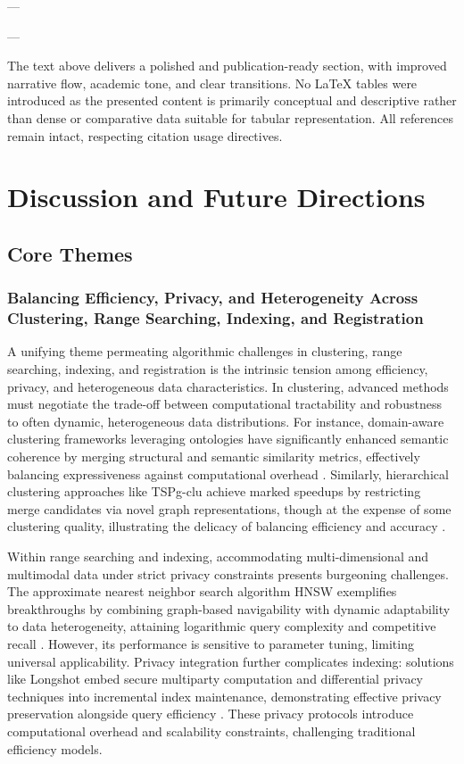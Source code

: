 \documentclass[11pt]{article}
\begin{document}
---

  


---

The text above delivers a polished and publication-ready section, with improved narrative flow, academic tone, and clear transitions. No LaTeX tables were introduced as the presented content is primarily conceptual and descriptive rather than dense or comparative data suitable for tabular representation. All references remain intact, respecting citation usage directives.

\section{Discussion and Future Directions}

\subsection{Core Themes}

\subsubsection{Balancing Efficiency, Privacy, and Heterogeneity Across Clustering, Range Searching, Indexing, and Registration}

A unifying theme permeating algorithmic challenges in clustering, range searching, indexing, and registration is the intrinsic tension among efficiency, privacy, and heterogeneous data characteristics. In clustering, advanced methods must negotiate the trade-off between computational tractability and robustness to often dynamic, heterogeneous data distributions. For instance, domain-aware clustering frameworks leveraging ontologies have significantly enhanced semantic coherence by merging structural and semantic similarity metrics, effectively balancing expressiveness against computational overhead \cite{ref23}. Similarly, hierarchical clustering approaches like TSPg-clu achieve marked speedups by restricting merge candidates via novel graph representations, though at the expense of some clustering quality, illustrating the delicacy of balancing efficiency and accuracy \cite{ref28}.

Within range searching and indexing, accommodating multi-dimensional and multimodal data under strict privacy constraints presents burgeoning challenges. The approximate nearest neighbor search algorithm HNSW exemplifies breakthroughs by combining graph-based navigability with dynamic adaptability to data heterogeneity, attaining logarithmic query complexity and competitive recall \cite{ref4}. However, its performance is sensitive to parameter tuning, limiting universal applicability. Privacy integration further complicates indexing: solutions like Longshot embed secure multiparty computation and differential privacy techniques into incremental index maintenance, demonstrating effective privacy preservation alongside query efficiency \cite{ref31}. These privacy protocols introduce computational overhead and scalability constraints, challenging traditional efficiency models.
\end{document}
